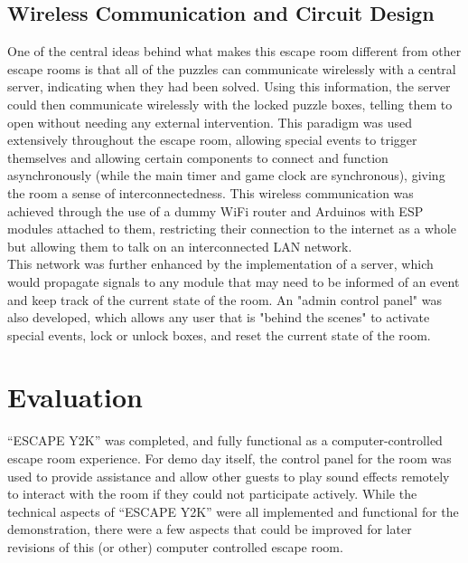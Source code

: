 \documentclass[conference]{IEEEtran}
\begin{document}
\subsection{Wireless Communication and Circuit Design} %
One of the central ideas behind what makes this escape room different from other escape rooms is that all of the puzzles can communicate
wirelessly with a central server, indicating when they had been solved. Using this information, the server could then communicate wirelessly with
the locked puzzle boxes, telling them to open without needing any external intervention. This paradigm was used extensively throughout the escape
room, allowing special events to trigger themselves and allowing certain components to connect and function asynchronously (while the main timer and game clock are synchronous), giving the room a 
sense of interconnectedness. This wireless communication was achieved through the use of a dummy WiFi router and Arduinos with ESP modules
attached to them, restricting their connection to the internet as a whole but allowing them to talk on an interconnected LAN network.
\\
\indent This network was further enhanced by the implementation of a server, which would propagate signals to any module that may need to be informed
of an event and keep track of the current state of the room. An "admin control panel" was also developed, which allows any user that is "behind the
scenes" to activate special events, lock or unlock boxes, and reset the current state of the room.


\section{Evaluation} %
\indent ``ESCAPE Y2K'' was completed, and fully functional as a computer-controlled escape room experience. For demo day itself, 
the control panel for the room was used to provide assistance and allow other guests to play sound effects remotely to 
interact with the room if they could not participate actively. While the technical aspects of ``ESCAPE Y2K'' were all 
implemented and functional for the demonstration, there were a few aspects that could be improved for later revisions 
of this (or other) computer controlled escape room.
\end{document}
